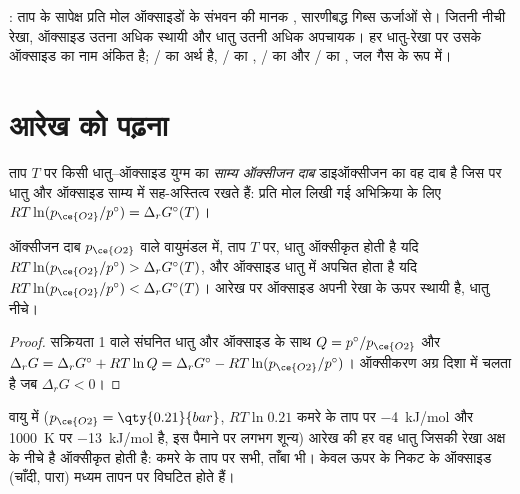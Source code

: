 \begin{omfigure}
{\small {}: ताप के सापेक्ष प्रति मोल  ऑक्साइडों के संभवन की मानक
, सारणीबद्ध गिब्स ऊर्जाओं से। जितनी नीची
रेखा, ऑक्साइड उतना अधिक स्थायी और धातु उतनी अधिक अपचायक।
हर धातु-रेखा पर उसके ऑक्साइड का नाम अंकित है; / का अर्थ  है,
/ का , / का 
और / का , जल गैस के रूप में।}
\end{omfigure}

\section{आरेख को पढ़ना}

\begin{definition}[साम्य ऑक्सीजन दाब]\label{def:b2:ellingham:oxygen-pressure}
ताप $T$ पर किसी धातु–ऑक्साइड युग्म का \emph{साम्य ऑक्सीजन दाब}
डाइऑक्सीजन का वह दाब है जिस पर धातु
और ऑक्साइड साम्य में सह-अस्तित्व रखते हैं: प्रति मोल  लिखी गई अभिक्रिया के लिए
$RT\ln(p_{\ce{O2}}/p^\circ) = \Delta_r
G^\circ(T)$।
\end{definition}

\begin{theorem}[धातु और ऑक्साइड के क्षेत्र]\label{thm:b2:ellingham:domains}
ऑक्सीजन दाब $p_{\ce{O2}}$ वाले वायुमंडल में, ताप $T$ पर,
धातु ऑक्सीकृत होती है यदि $RT\ln(p_{\ce{O2}}/p^\circ) > \Delta_r G^\circ(T)$, और
ऑक्साइड धातु में अपचित होता है यदि $RT\ln(p_{\ce{O2}}/p^\circ) < \Delta_r
G^\circ(T)$। आरेख पर ऑक्साइड अपनी रेखा के ऊपर स्थायी है, धातु
नीचे।
\end{theorem}

\begin{proof}
सक्रियता 1 वाले संघनित धातु और ऑक्साइड के साथ $Q = p^\circ/p_{\ce{O2}}$ और
$\Delta_r G = \Delta_r G^\circ + RT\ln Q = \Delta_r G^\circ - RT\ln(p_{\ce{O2}}/
p^\circ)$। ऑक्सीकरण अग्र दिशा में चलता है जब $\Delta_r G < 0$।
\end{proof}

वायु में ($p_{\ce{O2}} = \qty{0.21}{bar}$, $RT\ln 0.21$ कमरे के ताप पर \qty{-4}{kJ/mol}
और \qty{1000}{K} पर \qty{-13}{kJ/mol} है, इस पैमाने पर लगभग
शून्य) आरेख की हर वह धातु जिसकी रेखा अक्ष के नीचे है
ऑक्सीकृत होती है: कमरे के ताप पर सभी, ताँबा भी। केवल
ऊपर के निकट के ऑक्साइड (चाँदी, पारा) मध्यम तापन पर
विघटित होते हैं।

